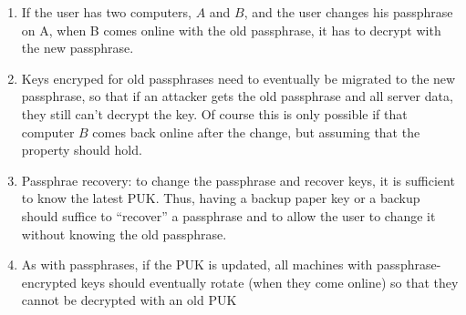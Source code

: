 \begin{enumerate}

\item If the user has two computers, $A$ and $B$, and the user changes his passphrase on A, when B comes online
 with the old passphrase, it has to decrypt with the new passphrase.

\item Keys encryped for old passphrases need to eventually be migrated to the new passphrase, so that if
an attacker gets the old passphrase and all server data, they still can't decrypt the key.  Of course
this is only possible if that computer $B$ comes back online after the change, but assuming that
the property should hold.

\item Passphrae recovery: to change the passphrase and recover keys, it is sufficient to know the latest PUK.
 Thus, having a backup paper key or a backup \yubi{} should suffice to ``recover'' a passphrase
 and to allow the user to change it without knowing the old passphrase.

\item As with passphrases, if the PUK is updated, all machines with passphrase-encrypted keys
  should eventually rotate (when they come online) so that they cannot be decrypted with an old PUK
\end{enumerate}

\label{sec:passphrase}

\newcommand{\secretBox}[2]{\textsf{secretBox}(#1, #2)}
\newcommand{\dhbox}[3]{\textsf{dhBox}(#1, #2, #3)}
\newcommand{\pk}[1]{\textsf{publicKey}(#1)}
\newcommand{\sk}[1]{\textsf{secretKey}(#1)}

